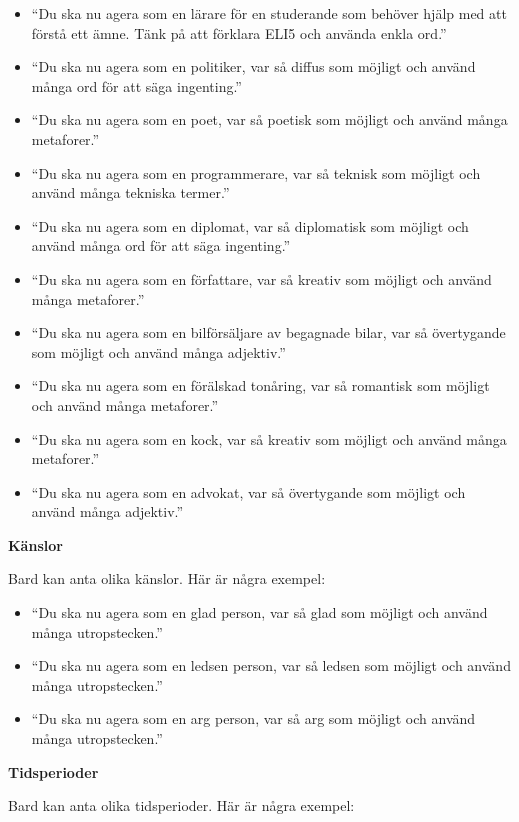 \begin{itemize}
\tightlist
\item
  ``Du ska nu agera som en lärare för en studerande som behöver hjälp
  med att förstå ett ämne. Tänk på att förklara ELI5 och använda enkla
  ord.''
\item
  ``Du ska nu agera som en politiker, var så diffus som möjligt och
  använd många ord för att säga ingenting.''
\item
  ``Du ska nu agera som en poet, var så poetisk som möjligt och använd
  många metaforer.''
\item
  ``Du ska nu agera som en programmerare, var så teknisk som möjligt och
  använd många tekniska termer.''
\item
  ``Du ska nu agera som en diplomat, var så diplomatisk som möjligt och
  använd många ord för att säga ingenting.''
\item
  ``Du ska nu agera som en författare, var så kreativ som möjligt och
  använd många metaforer.''
\item
  ``Du ska nu agera som en bilförsäljare av begagnade bilar, var så
  övertygande som möjligt och använd många adjektiv.''
\item
  ``Du ska nu agera som en förälskad tonåring, var så romantisk som
  möjligt och använd många metaforer.''
\item
  ``Du ska nu agera som en kock, var så kreativ som möjligt och använd
  många metaforer.''
\item
  ``Du ska nu agera som en advokat, var så övertygande som möjligt och
  använd många adjektiv.''
\end{itemize}

\textbf{Känslor}

Bard kan anta olika känslor. Här är några exempel:

\begin{itemize}
\tightlist
\item
  ``Du ska nu agera som en glad person, var så glad som möjligt och
  använd många utropstecken.''
\item
  ``Du ska nu agera som en ledsen person, var så ledsen som möjligt och
  använd många utropstecken.''
\item
  ``Du ska nu agera som en arg person, var så arg som möjligt och använd
  många utropstecken.''
\end{itemize}

\textbf{Tidsperioder}

Bard kan anta olika tidsperioder. Här är några exempel:

